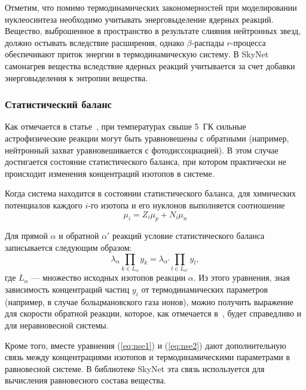 Отметим, что помимо термодинамических закономерностей при моделировании нуклеосинтеза необходимо учитывать энерговыделение ядерных реакций. Вещество, выброшенное в пространство в результате слияния нейтронных звезд, должно остывать вследствие расширения, однако $\beta$-распады $r$-процесса обеспечивают приток энергии в термодинамическую систему. В SkyNet самонагрев вещества вследствие ядерных реакций учитывается за счет добавки энерговыделения к энтропии вещества.

\subsubsection{Статистический баланс}
\label{sec:nse}
Как отмечается в статье~\cite{lippuner2017}, при температурах свыше 5~ГК сильные астрофизические реакции могут быть уравновешены с обратными (например, нейтронный захват уравновешивается с фотодиссоциацией). В этом случае достигается состояние статистического баланса, при котором практически не происходит изменения концентраций изотопов в системе. 

Когда система находится в состоянии статистического баланса, для химических потенциалов каждого $i$-го изотопа и его нуклонов выполняется соотношение
\begin{equation}
  \mu_i = Z_i \mu_p + N_i \mu_n
  \label{eq:nse1}
\end{equation}

Для прямой $\alpha$ и обратной $\alpha'$ реакций условие статистического баланса записывается следующим образом:
\begin{equation}
\lambda_\alpha \prod_{k \in L_\alpha} y_k = \lambda_{\alpha'} \prod_{l \in L_{\alpha'}} y_l,
\label{eq:nse2}
\end{equation}
где $L_\alpha$ --- множество исходных изотопов реакции $\alpha$. Из этого уравнения, зная зависимость концентраций частиц $y_i$ от термодинамических параметров (например, в случае больцмановского газа ионов), можно получить выражение для скорости обратной реакции, которое, как отмечается в~\cite{lippuner2017}, будет справедливо и для неравновесной системы. 

Кроме того, вместе уравнения (\ref{eq:nse1}) и (\ref{eq:nse2}) дают дополнительную связь между концентрациями изотопов и термодинамическими параметрами в равновесной системе. В библиотеке SkyNet эта связь используется для вычисления равновесного состава вещества.
